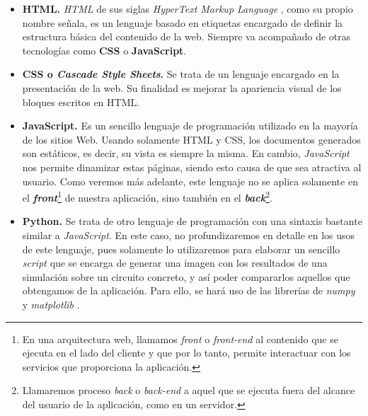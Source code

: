 \documentclass[../main.tex]{subfiles}
\begin{document}
\begin{itemize}
    \item \textbf{HTML. }\textit{HTML} de sus siglas \textit{HyperText Markup Language} \cite{htmldef}, como su propio nombre señala, es un lenguaje basado en etiquetas encargado de definir la estructura básica del contenido de la web. Siempre va acompañado de otras tecnologías como \textbf{CSS} o \textbf{JavaScript}.
    \item \textbf{CSS o \textit{Cascade Style Sheets}. } \cite{cssdef} Se trata de un lenguaje encargado en la presentación de la web. Su finalidad es mejorar la apariencia visual de los bloques escritos en HTML.
    \item \textbf{JavaScript. } Es un sencillo lenguaje de programación \cite{jsdef} utilizado en la mayoría de los sitios Web. Usando solamente HTML y CSS, los documentos generados son estáticos, es decir, su vista es siempre la misma. En cambio, \textit{JavaScript} nos permite dinamizar estas páginas, siendo esto causa de que sea atractiva al usuario. Como veremos más adelante, este lenguaje no se aplica solamente en el \textit{\textbf{front}}\footnote{En una arquitectura web, llamamos \textit{front} o \textit{front-end} al contenido que se ejecuta en el lado del cliente y que por lo tanto, permite interactuar con los servicios que proporciona la aplicación.} de nuestra aplicación, sino también en el \textit{\textbf{back}}\footnote{Llamaremos proceso \textit{back} o \textit{back-end} a aquel que se ejecuta fuera del alcance del usuario de la aplicación, como en un servidor.}.

    \item \textbf{Python. }Se trata de otro lenguaje de programación con una sintaxis bastante similar a \textit{JavaScript}. En este caso, no profundizaremos en detalle en los usos de este lenguaje, pues solamente lo utilizaremos para elaborar un sencillo \textit{script} que se encarga de generar una imagen con los resultados de una simulación sobre un circuito concreto, y así poder compararlos aquellos que obtengamos de la aplicación. Para ello, se hará uso de las librerías de \textit{numpy} \cite{numpy} y \textit{matplotlib} \cite{matplotlib}.
    
\end{itemize}
\end{document}
